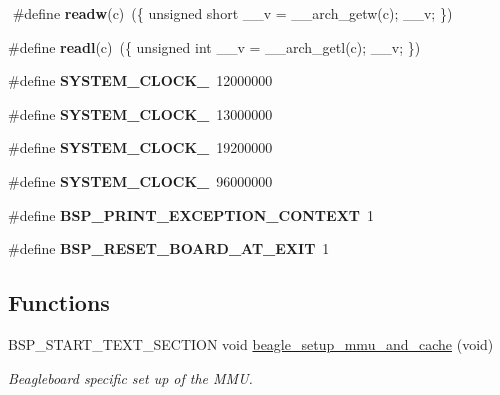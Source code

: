 \begin{DoxyCompactItemize}
$$\mbox{\label{group__RTEMSBSPsARMBeagle_gafcbb04d3d8f691fae7460e03f720c604}} 
\#define {\bfseries readw}(c)~(\{ unsigned short \+\_\+\+\_\+v = \+\_\+\+\_\+arch\+\_\+getw(c); \+\_\+\+\_\+v; \})
\item 
\mbox{\label{group__RTEMSBSPsARMBeagle_gaf9ba16729cfec1798008e2abbd8c37f1}} 
\#define {\bfseries readl}(c)~(\{ unsigned int \+\_\+\+\_\+v = \+\_\+\+\_\+arch\+\_\+getl(c); \+\_\+\+\_\+v; \})
\item 
\mbox{\label{group__RTEMSBSPsARMBeagle_gadd10988307417651efc5ff7ba1a9aff2}} 
\#define {\bfseries S\+Y\+S\+T\+E\+M\+\_\+\+C\+L\+O\+C\+K\+\_}~12000000
\item 
\mbox{\label{group__RTEMSBSPsARMBeagle_ga4b504651e2c5e7a6e3b17de1fe304e2d}} 
\#define {\bfseries S\+Y\+S\+T\+E\+M\+\_\+\+C\+L\+O\+C\+K\+\_}~13000000
\item 
\mbox{\label{group__RTEMSBSPsARMBeagle_gac8eccc648b8d38a0b82e4aa4c67d9ab1}} 
\#define {\bfseries S\+Y\+S\+T\+E\+M\+\_\+\+C\+L\+O\+C\+K\+\_}~19200000
\item 
\mbox{\label{group__RTEMSBSPsARMBeagle_gafca1a56fa796240493d4a02ce82880d5}} 
\#define {\bfseries S\+Y\+S\+T\+E\+M\+\_\+\+C\+L\+O\+C\+K\+\_}~96000000
\item 
\mbox{\label{group__RTEMSBSPsARMBeagle_gaeec06ac899fdd3dbd4718ed3bd612d71}} 
\#define {\bfseries B\+S\+P\+\_\+\+P\+R\+I\+N\+T\+\_\+\+E\+X\+C\+E\+P\+T\+I\+O\+N\+\_\+\+C\+O\+N\+T\+E\+XT}~1
\item 
\mbox{\label{group__RTEMSBSPsARMBeagle_ga84904a73cf300b0083041bedb16b681e}} 
\#define {\bfseries B\+S\+P\+\_\+\+R\+E\+S\+E\+T\+\_\+\+B\+O\+A\+R\+D\+\_\+\+A\+T\+\_\+\+E\+X\+IT}~1
\end{DoxyCompactItemize}
\subsection*{Functions}
\begin{DoxyCompactItemize}
\item 
B\+S\+P\+\_\+\+S\+T\+A\+R\+T\+\_\+\+T\+E\+X\+T\+\_\+\+S\+E\+C\+T\+I\+ON void \mbox{\hyperlink{group__RTEMSBSPsARMBeagle_ga0c87308264dd017a7077234a981dca6e}{beagle\+\_\+setup\+\_\+mmu\+\_\+and\+\_\+cache}} (void)
\begin{DoxyCompactList}\small\item\em Beagleboard specific set up of the M\+MU. \end{DoxyCompactList}\end{DoxyCompactItemize}



